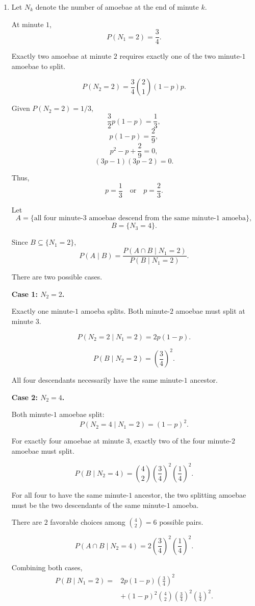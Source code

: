 \documentclass[11pt,a4paper]{article}
\begin{document}
\begin{enumerate}

\item[(c)]

Let $N_k$ denote the number of amoebae at the end
of minute $k$.

At minute $1$,
\[
P(N_1=2)=\frac34.
\]

Exactly two amoebae at minute $2$ requires exactly
one of the two minute-$1$ amoebae to split.

\[
P(N_2=2)
=\frac34\binom21(1-p)p.
\]

Given $P(N_2=2)=1/3$,
\[
\frac32p(1-p)=\frac13,
\]
\[
p(1-p)=\frac29,
\]
\[
p^2-p+\frac29=0,
\]
\[
(3p-1)(3p-2)=0.
\]

Thus,
\[
p=\frac13
\quad\text{or}\quad
p=\frac23.
\]

Let
\[
A=\{\text{all four minute-3 amoebae descend
from the same minute-1 amoeba}\},
\]
\[
B=\{N_3=4\}.
\]

Since $B\subseteq\{N_1=2\}$,
\[
P(A\mid B)
=\frac{P(A\cap B\mid N_1=2)}
{P(B\mid N_1=2)}.
\]

There are two possible cases.

\medskip
\noindent\textbf{Case 1: $N_2=2$.}

Exactly one minute-$1$ amoeba splits.
Both minute-$2$ amoebae must split at minute $3$.

\[
P(N_2=2\mid N_1=2)
=2p(1-p).
\]

\[
P(B\mid N_2=2)
=\left(\frac34\right)^2.
\]

All four descendants necessarily have the same
minute-$1$ ancestor.

\medskip
\noindent\textbf{Case 2: $N_2=4$.}

Both minute-$1$ amoebae split:
\[
P(N_2=4\mid N_1=2)=(1-p)^2.
\]

For exactly four amoebae at minute $3$,
exactly two of the four minute-$2$ amoebae must split.

\[
P(B\mid N_2=4)
=\binom42
\left(\frac34\right)^2
\left(\frac14\right)^2.
\]

For all four to have the same minute-$1$ ancestor,
the two splitting amoebae must be the two descendants
of the same minute-$1$ amoeba.

There are $2$ favorable choices among
$\binom42=6$ possible pairs.

\[
P(A\cap B\mid N_2=4)
=2\left(\frac34\right)^2
\left(\frac14\right)^2.
\]

Combining both cases,
\[
\begin{aligned}
P(B\mid N_1=2)
={}&2p(1-p)\left(\frac34\right)^2\\
&+(1-p)^2\binom42
\left(\frac34\right)^2
\left(\frac14\right)^2.
\end{aligned}
\]


\end{enumerate}
\end{document}
